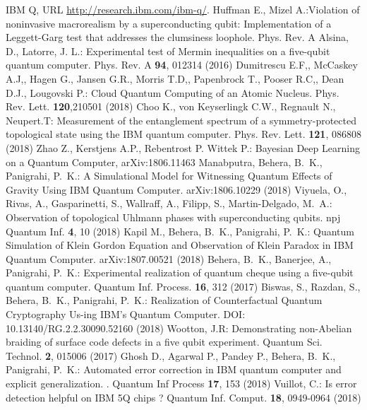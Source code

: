 \begin{thebibliography}{66}
 IBM Q, URL \url{http://research.ibm.com/ibm-q/}.
 Huffman E., Mizel A.:Violation of noninvasive macrorealism by a superconducting qubit: Implementation of a Leggett-Garg test that addresses the clumsiness loophole. Phys. Rev. A
 Alsina, D., Latorre, J. L.: Experimental test of Mermin inequalities on a five-qubit quantum computer. Phys. Rev. A
\textbf{94}, 012314 (2016)
 Dumitrescu E.F,, McCaskey A.J,, Hagen G., Jansen G.R., Morris T.D,, Papenbrock T., Pooser R.C,, Dean D.J., Lougovski P.: Cloud Quantum Computing of an Atomic Nucleus. Phys. Rev. Lett. \textbf{120},210501 (2018)
 Choo K., von Keyserlingk C.W., Regnault N., Neupert.T: Measurement of the entanglement spectrum of a symmetry-protected topological state using the IBM quantum computer.
Phys. Rev. Lett. \textbf{121}, 086808 (2018)
 Zhao Z., Kerstjens A.P., Rebentrost P. Wittek P.: Bayesian Deep Learning on a Quantum Computer, 	arXiv:1806.11463
 Manabputra, Behera, B.~K., Panigrahi, P.~K.: A Simulational Model for Witnessing Quantum Effects of Gravity Using IBM Quantum Computer. arXiv:1806.10229 (2018)
 Viyuela, O., Rivas, A., Gasparinetti, S., Wallraff, A., Filipp, S., Martin-Delgado, M.~A.: Observation of topological Uhlmann phases with superconducting qubits. npj Quantum Inf. \textbf{4}, 10 (2018) 
 Kapil M., Behera, B.~K., Panigrahi, P.~K.: Quantum Simulation of Klein Gordon Equation and Observation of Klein Paradox in IBM Quantum Computer. arXiv:1807.00521 (2018)
 Behera, B.~K., Banerjee, A., Panigrahi, P.~K.: Experimental realization of quantum cheque using a five-qubit quantum computer. Quantum Inf. Process. \textbf{16}, 312 (2017) 
 Biswas, S., Razdan, S., Behera, B.~K., Panigrahi, P.~K.: Realization of Counterfactual Quantum Cryptography Us-ing IBM's Quantum Computer. DOI: 10.13140/RG.2.2.30090.52160 (2018) 
 Wootton, J.R: Demonstrating non-Abelian braiding of surface code defects in a five qubit experiment. Quantum Sci. Technol. \textbf{2}, 015006 (2017)
 Ghosh D., Agarwal P., Pandey P., Behera, B.~K., Panigrahi, P.~K.: Automated error correction in IBM quantum computer and explicit generalization. . Quantum Inf Process \textbf{17}, 153 (2018)
 Vuillot, C.: Is error detection helpful on IBM 5Q chips ? Quantum Inf. Comput. \textbf{18}, 0949-0964 (2018) 

\end{thebibliography}
